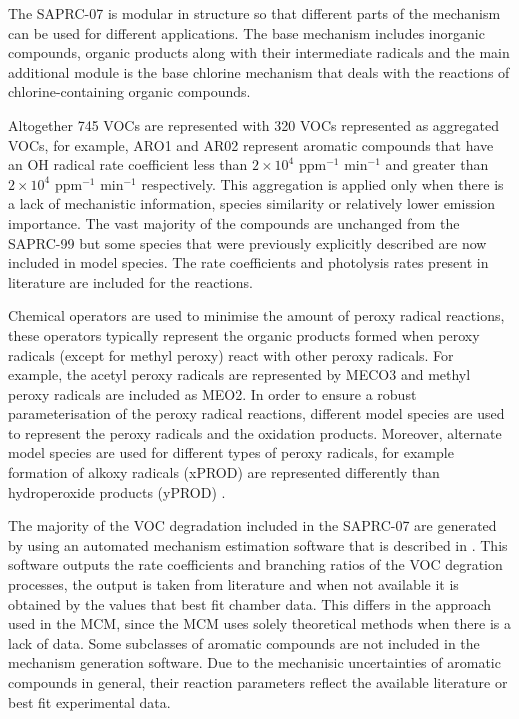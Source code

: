 The SAPRC-07 is modular in structure so that different parts of the mechanism can be used for different applications. The base 
mechanism includes inorganic compounds, organic products along with their intermediate radicals and the main additional module 
is the base chlorine mechanism that deals with the reactions of chlorine-containing organic compounds. 

Altogether 745 VOCs are represented with 320 VOCs represented as aggregated VOCs, for example, ARO1 and AR02 represent aromatic
compounds that have an OH radical rate coefficient less than $2 \times 10^4$ ppm$^{-1}$ min$^{-1}$ and greater than 
$2 \times 10^4$ ppm$^{-1}$ min$^{-1}$ respectively. This aggregation is applied only when there is a lack of mechanistic 
information, species similarity or relatively lower emission importance. The vast majority of the compounds are unchanged from 
the SAPRC-99 but some species that were previously explicitly described are now included in model species. The rate 
coefficients and photolysis rates present in literature are included for the reactions. 

Chemical operators are used to minimise the amount of peroxy radical reactions, these operators typically represent the organic
products formed when peroxy radicals (except for methyl peroxy) react with other peroxy radicals. For example, the acetyl 
peroxy radicals are represented by MECO3 and methyl peroxy radicals are included as MEO2. In order to ensure a robust 
parameterisation of the peroxy radical reactions, different model species are used to represent the peroxy radicals and the 
oxidation products. Moreover, alternate model species are used for different types of peroxy radicals, for example formation of
alkoxy radicals (xPROD) are represented differently than hydroperoxide products (yPROD) \citep{Carter:2010}.

The majority of the VOC degradation included in the SAPRC-07 are generated by using an automated mechanism estimation software 
that is described in \citep{Carter:2000}. This software outputs the rate coefficients and branching ratios of the VOC degration 
processes, the output is taken from literature and when not available it is obtained by the values that best fit chamber data. 
This differs in the approach used in the MCM, since the MCM uses solely theoretical methods when there is a lack of data. Some 
subclasses of aromatic compounds are not included in the mechanism generation software. Due to the mechanisic uncertainties of 
aromatic compounds in general, their reaction parameters reflect the available literature or best fit experimental data.

